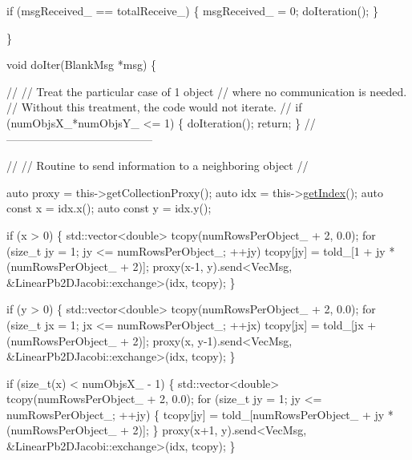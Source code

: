 \begin{DoxyCodeInclude}
    \textcolor{keywordflow}{if} (msgReceived\_ == totalReceive\_) \{
      msgReceived\_ = 0;
      doIteration();
    \}

  \}

  \textcolor{keywordtype}{void} doIter(BlankMsg *msg) \{

    \textcolor{comment}{//}
    \textcolor{comment}{// Treat the particular case of 1 object}
    \textcolor{comment}{// where no communication is needed.}
    \textcolor{comment}{// Without this treatment, the code would not iterate.}
    \textcolor{comment}{//}
    \textcolor{keywordflow}{if} (numObjsX\_*numObjsY\_ <= 1) \{
      doIteration();
      \textcolor{keywordflow}{return};
    \}
    \textcolor{comment}{//---------------------------------------}

    \textcolor{comment}{//}
    \textcolor{comment}{// Routine to send information to a neighboring object}
    \textcolor{comment}{//}

    \textcolor{keyword}{auto} proxy = this->getCollectionProxy();
    \textcolor{keyword}{auto} idx = this->\hyperlink{namespacecheckpoint_1_1dispatch_1_1typeregistry_aa75ef84e9b63a687784360ded2d56fe4}{getIndex}();
    \textcolor{keyword}{auto} \textcolor{keyword}{const} x = idx.x();
    \textcolor{keyword}{auto} \textcolor{keyword}{const} y = idx.y();

    \textcolor{keywordflow}{if} (x > 0) \{
      std::vector<double> tcopy(numRowsPerObject\_ + 2, 0.0);
      \textcolor{keywordflow}{for} (\textcolor{keywordtype}{size\_t} jy = 1; jy <= numRowsPerObject\_; ++jy)
        tcopy[jy] = told\_[1 + jy * (numRowsPerObject\_ + 2)];
      proxy(x-1, y).send<VecMsg, &LinearPb2DJacobi::exchange>(idx, tcopy);
    \}

    \textcolor{keywordflow}{if} (y > 0) \{
      std::vector<double> tcopy(numRowsPerObject\_ + 2, 0.0);
      \textcolor{keywordflow}{for} (\textcolor{keywordtype}{size\_t} jx = 1; jx <= numRowsPerObject\_; ++jx)
        tcopy[jx] = told\_[jx + (numRowsPerObject\_ + 2)];
      proxy(x, y-1).send<VecMsg, &LinearPb2DJacobi::exchange>(idx, tcopy);
    \}

    \textcolor{keywordflow}{if} (\textcolor{keywordtype}{size\_t}(x) < numObjsX\_ - 1) \{
      std::vector<double> tcopy(numRowsPerObject\_ + 2, 0.0);
      \textcolor{keywordflow}{for} (\textcolor{keywordtype}{size\_t} jy = 1; jy <= numRowsPerObject\_; ++jy) \{
        tcopy[jy] = told\_[numRowsPerObject\_ +
                          jy * (numRowsPerObject\_ + 2)];
      \}
      proxy(x+1, y).send<VecMsg, &LinearPb2DJacobi::exchange>(idx, tcopy);
    \}


\end{DoxyCodeInclude}
